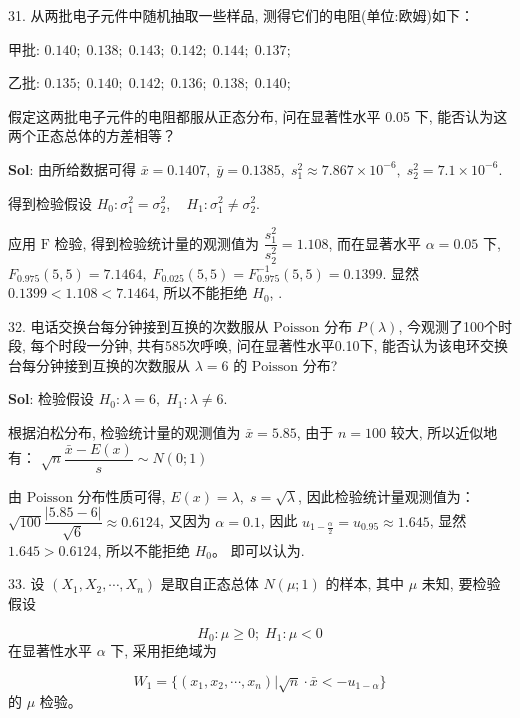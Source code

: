 

31. 从两批电子元件中随机抽取一些样品, 测得它们的电阻(单位:欧姆)如下： \par 
甲批: $0.140;\;0.138;\;0.143;\;0.142;\;0.144;\;0.137;\;$  \par
乙批: $0.135;\;0.140;\;0.142;\;0.136;\;0.138;\;0.140;\;$

假定这两批电子元件的电阻都服从正态分布, 问在显著性水平 0.05 下, 能否认为这两个正态总体的方差相等？

\textbf{Sol}: 由所给数据可得 $\bar{x}=0.1407,\;\bar{y}=0.1385,\;s_1^2\approx7.867\times 10^{-6},\;s_2^2=7.1\times10^{-6}$.

得到检验假设 $H_0:\sigma_1^2=\sigma_2^2,\quad H_1:\sigma_1^2\not=\sigma_2^2$.

应用 $\text{F}$ 检验, 得到检验统计量的观测值为 $\dfrac{s_1^2}{s_2^2}=1.108$, 而在显著水平 $\alpha=0.05$ 下, $F_{0.975}(5,5)=7.1464,\;F_{0.025}(5,5)=F^{-1}_{0.975}(5,5)=0.1399$. 显然 $0.1399<1.108<7.1464$, 
所以不能拒绝 $H_0$, 
. 


\vspace{12pt}

32. 电话交换台每分钟接到互换的次数服从 $\text{Poisson}$ 分布 $P(\lambda)$, 今观测了100个时段, 每个时段一分钟, 共有585次呼唤, 问在显著性水平0.10下, 能否认为该电环交换台每分钟接到互换的次数服从 $\lambda=6$ 的 $\text{Poisson}$ 分布?

\textbf{Sol}: 检验假设 $H_0:\lambda=6,\;H_1:\lambda\not=6$.

根据泊松分布, 检验统计量的观测值为 $\bar{x}=5.85$, 
由于 $n=100$ 较大, 所以近似地有： $\sqrt{n}\dfrac{\bar{x}-E(x)}{s}\sim N(0;1)$

由 $\text{Poisson}$ 分布性质可得, $E(x)=\lambda,\;s=\sqrt{\lambda}$, 
因此检验统计量观测值为：$\sqrt{100}\dfrac{|5.85-6|}{\sqrt{6}}\approx0.6124$, 
又因为 $\alpha=0.1$, 因此 $u_{1-\frac{\alpha}{2}}=u_{0.95}\approx1.645$, 
显然 $1.645>0.6124$, 所以不能拒绝 $H_0$。
即可以认为.




\vspace{12pt}

33. 设 $(X_1,X_2,\cdots,X_n)$ 是取自正态总体 $N(\mu;1)$ 的样本, 其中 $\mu$ 未知, 要检验假设

$$
H_0:\mu\geqslant0;\;H_1:\mu<0
$$
在显著性水平 $\alpha$ 下, 采用拒绝域为

$$
W_1=\big\{(x_1,x_2,\cdots,x_n)\big|\sqrt{n}\cdot\bar{x}<-u_{1-\alpha}\big\}
$$
的 $\mu$ 检验。

